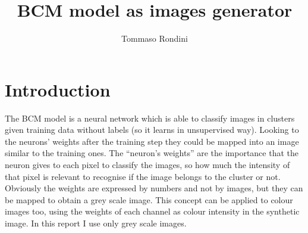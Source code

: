 \documentclass[a4paper,12pt]{article}
\title{BCM model as images generator}
\author{Tommaso Rondini}
\begin{document}
\maketitle

\section{Introduction}
The BCM model is a neural network which is able to classify images in clusters given training data without labels (so it learns in unsupervised way).
Looking to the neurons' weights after the training step they could be mapped into an image similar to the training ones.
The ``neuron's weights'' are the importance that the neuron gives to each pixel to classify the images, so how much the intensity of that pixel is relevant to recognise if the image belongs to the cluster or not.
Obviously the weights are expressed by numbers and not by images, but they can be mapped to obtain a grey scale image.
This concept can be applied to colour images too, using the weights of each channel as colour intensity in the synthetic image.
In this report I use only grey scale images.
\end{document}
